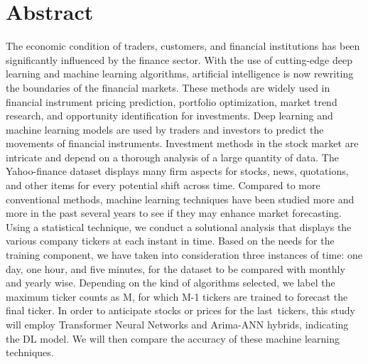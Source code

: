 \chapter*{\center \Large  Abstract}

The economic condition of traders, customers, and financial institutions has been significantly influenced by the finance sector. With the use of cutting-edge deep learning and machine learning algorithms, artificial intelligence is now rewriting the boundaries of the financial markets. These methods are widely used in financial instrument pricing prediction, portfolio optimization, market trend research, and opportunity identification for investments. Deep learning and machine learning models are used by traders and investors to predict the movements of financial instruments. Investment methods in the stock market are intricate and depend on a thorough analysis of a large quantity of data. The Yahoo-finance dataset displays many firm aspects for stocks, news, quotations, and other items for every potential shift across time. Compared to more conventional methods, machine learning techniques have been studied more and more in the past several years to see if they may enhance market forecasting. 
Using a statistical technique, we conduct a solutional analysis that displays the various company tickers at each instant in time. Based on the needs for the training component, we have taken into consideration three instances of time: one day, one hour, and five minutes, for the dataset to be compared with monthly and yearly wise. 
Depending on the kind of algorithms selected, we label the maximum ticker counts as M, for which M-1 tickers are trained to forecast the final ticker. In order to anticipate stocks or prices for the last tickers, this study will employ Transformer Neural Networks and Arima-ANN hybrids, indicating the DL model. We will then compare the accuracy of these machine learning techniques. 


